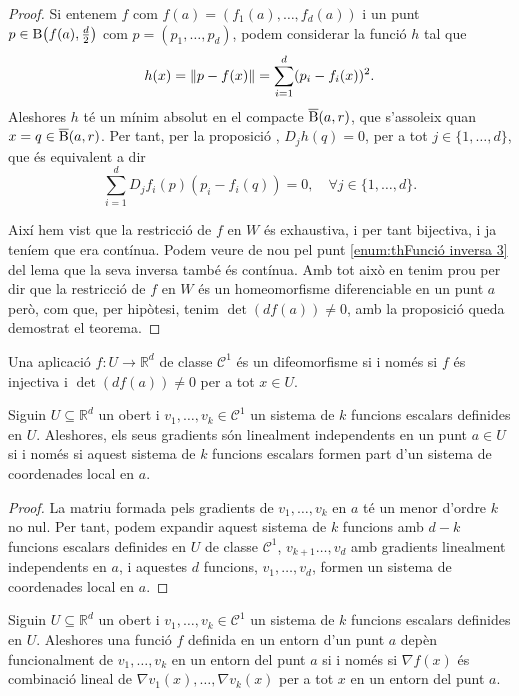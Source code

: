 \documentclass[../Apunts.tex]{subfiles}
\begin{document}
\begin{theorem}
\begin{proof}
			Si entenem \(f\) com \(f(a)=(f_{1}(a),\dots,f_{d}(a))\) i un punt \(p\in\B\left(f(a),\tfrac{d}{2}\right)\) com \(p=(p_{1},\dots,p_{d})\), podem considerar la funció \(h\) tal que
			\[h(x)=\norm{p-f(x)}=\sum_{i=1}^{d}(p_{i}-f_{i}(x))^{2}.\]
			Aleshores \(h\) té un mínim absolut en el compacte \(\overline{\operatorname{B}}(a,r)\), que s'assoleix quan \(x=q\in\overline{\operatorname{B}}(a,r)\). Per tant, per la proposició , \(D_{j}h(q)=0\), per a tot \(j\in\{1,\dots,d\}\), que és equivalent a dir
			\[\sum_{i=1}^{d}D_{j}f_{i}(p)(p_{i}-f_{i}(q))=0,\quad\forall j\in\{1,\dots,d\}.\]
			
			Així hem vist que la restricció de \(f\) en \(W\) és exhaustiva, i per tant bijectiva, i ja teníem que era contínua. Podem veure de nou pel punt \eqref{enum:thFunció inversa 3} del lema  que la seva inversa també és contínua. Amb tot això en tenim prou per dir que la restricció de \(f\) en \(W\) és un homeomorfisme diferenciable en un punt \(a\) però, com que, per hipòtesi, tenim \(\det(df(a))\neq0\), amb la proposició  queda demostrat el teorema.
		\end{proof}
	\end{theorem}
	\begin{corollary} %
		Una aplicació \(f\colon U\to \mathbb{R}^{d}\) de classe \(\mathcal{C}^{1}\) és un difeomorfisme si i només si \(f\) és injectiva i \(\det(df(a))\neq0\) per a tot \(x\in U\).
	\end{corollary}
	\begin{proposition}
		Siguin \(U\subseteq\mathbb{R}^{d}\) un obert i \(v_{1},\dots,v_{k}\in\mathcal{C}^{1}\) un sistema de \(k\) funcions escalars definides en \(U\). Aleshores, els seus gradients són linealment independents en un punt \(a\in U\) si i només si aquest sistema de \(k\) funcions escalars formen part d'un sistema de coordenades local en \(a\).
		\begin{proof}
			La matriu formada pels gradients de \(v_{1},\dots,v_{k}\) en \(a\) té un menor d'ordre \(k\) no nul. Per tant, podem expandir aquest sistema de \(k\) funcions amb \(d-k\) funcions escalars definides en \(U\) de classe \(\mathcal{C}^{1}\), \(v_{k+1}\dots,v_{d}\) amb gradients linealment independents en \(a\), i aquestes \(d\) funcions, \(v_{1},\dots,v_{d}\), formen un sistema de coordenades local en \(a\).
		\end{proof}
	\end{proposition}
	\begin{corollary}\label{corollary:dependència funcional iff dependència lineal dels gradients}
		Siguin \(U\subseteq\mathbb{R}^{d}\) un obert i \(v_{1},\dots,v_{k}\in\mathcal{C}^{1}\) un sistema de \(k\) funcions escalars definides en \(U\). Aleshores una funció \(f\) definida en un entorn d'un punt \(a\) depèn funcionalment de \(v_{1},\dots,v_{k}\) en un entorn del punt \(a\) si i només si \(\nabla f(x)\) és combinació lineal de \(\nabla v_{1}(x),\dots,\nabla v_{k}(x)\) per a tot \(x\) en un entorn del punt \(a\).
	\end{corollary}
\end{document}
